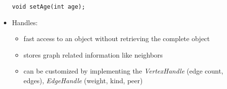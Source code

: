 \begin{itemize}
\begin{lstlisting}[caption=(Subclass of Person with additional "age" property)]
	void setAge(int age);
	\end{lstlisting}

\item Handles:
	\begin{itemize}
		\item fast access to an object without retrieving the complete object
		\item stores graph related information like neighbors
		\item can be customized  by implementing the \textit{VertexHandle}
		(edge count, edges), \textit{EdgeHandle} (weight, kind, peer)
	\end{itemize}
\end{itemize}
